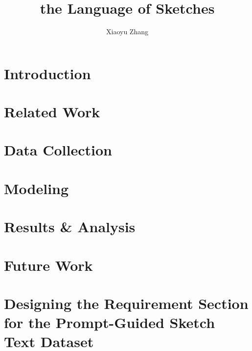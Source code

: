 \documentclass[twoside]{report}
\begin{document}
    \title{the Language of Sketches}
\author{Xiaoyu Zhang}

\beforepreface
{}



\afterpreface

\chapter{Introduction} \label{introductionChapter}


\chapter{Related Work} \label{relatedWorkChapter}


\chapter{Data Collection} \label{dataChapter}


\chapter{Modeling} \label{modelingChapter}


\chapter{Results \& Analysis} \label{analysisChapter}



\chapter{Future Work} \label{futureChapter}


\appendix
\chapter{Designing the Requirement Section for the Prompt-Guided Sketch Text Dataset} \label{appendixDataV1Req}


\renewcommand{\bibname}{Bibliography}


\end{document}
